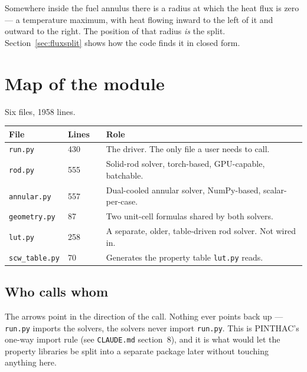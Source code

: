 \documentclass[11pt]{article}
\newcommand{\code}[1]{\texttt{#1}}
\begin{document}
Somewhere inside the fuel annulus there is a radius at which the heat flux is zero --- a
temperature maximum, with heat flowing inward to the left of it and outward to the
right. The position of that radius \emph{is} the split. Section~\ref{sec:fluxsplit}
shows how the code finds it in closed form.

\section{Map of the module}

Six files, 1958 lines.

\begin{center}
\begin{tabular}{llr p{6.3cm}}
\toprule
File & Lines & & Role \\
\midrule
\code{run.py}      & 430 & & The driver. The only file a user needs to call. \\
\code{rod.py}      & 555 & & Solid-rod solver, torch-based, GPU-capable, batchable. \\
\code{annular.py}  & 557 & & Dual-cooled annular solver, NumPy-based, scalar-per-case. \\
\code{geometry.py} &  87 & & Two unit-cell formulas shared by both solvers. \\
\code{lut.py}      & 258 & & A separate, older, table-driven rod solver. Not wired in. \\
\code{scw\_table.py} & 70 & & Generates the property table \code{lut.py} reads. \\
\bottomrule
\end{tabular}
\end{center}

\subsection{Who calls whom}

The arrows point in the direction of the call. Nothing ever points back up ---
\code{run.py} imports the solvers, the solvers never import \code{run.py}. This is
PINTHAC's one-way import rule (see \code{CLAUDE.md} section~8), and it is what would let
the property libraries be split into a separate package later without touching anything
here.
\end{document}
